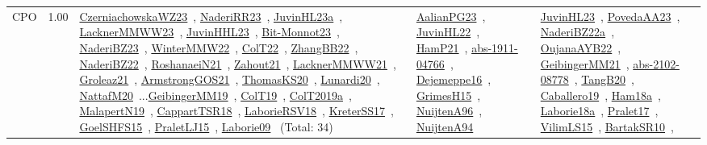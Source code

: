 {\begin{longtable}{p{3cm}r>{\raggedright\arraybackslash}p{6cm}>{\raggedright\arraybackslash}p{6cm}>{\raggedright\arraybackslash}p{8cm}}
\index{CPO}\index{CPSystems!CPO}CPO &  1.00 & \href{../works/CzerniachowskaWZ23.pdf}{CzerniachowskaWZ23}~\cite{CzerniachowskaWZ23}, \href{../works/NaderiRR23.pdf}{NaderiRR23}~\cite{NaderiRR23}, \href{../works/JuvinHL23a.pdf}{JuvinHL23a}~\cite{JuvinHL23a}, \href{../works/LacknerMMWW23.pdf}{LacknerMMWW23}~\cite{LacknerMMWW23}, \href{../works/JuvinHHL23.pdf}{JuvinHHL23}~\cite{JuvinHHL23}, \href{../works/Bit-Monnot23.pdf}{Bit-Monnot23}~\cite{Bit-Monnot23}, \href{../works/NaderiBZ23.pdf}{NaderiBZ23}~\cite{NaderiBZ23}, \href{../works/WinterMMW22.pdf}{WinterMMW22}~\cite{WinterMMW22}, \href{../works/ColT22.pdf}{ColT22}~\cite{ColT22}, \href{../works/ZhangBB22.pdf}{ZhangBB22}~\cite{ZhangBB22}, \href{../works/NaderiBZ22.pdf}{NaderiBZ22}~\cite{NaderiBZ22}, \href{../works/RoshanaeiN21.pdf}{RoshanaeiN21}~\cite{RoshanaeiN21}, \href{../works/Zahout21.pdf}{Zahout21}~\cite{Zahout21}, \href{../works/LacknerMMWW21.pdf}{LacknerMMWW21}~\cite{LacknerMMWW21}, \href{../works/Groleaz21.pdf}{Groleaz21}~\cite{Groleaz21}, \href{../works/ArmstrongGOS21.pdf}{ArmstrongGOS21}~\cite{ArmstrongGOS21}, \href{../works/ThomasKS20.pdf}{ThomasKS20}~\cite{ThomasKS20}, \href{../works/Lunardi20.pdf}{Lunardi20}~\cite{Lunardi20}, \href{../works/NattafM20.pdf}{NattafM20}~\cite{NattafM20}...\href{../works/GeibingerMM19.pdf}{GeibingerMM19}~\cite{GeibingerMM19}, \href{../works/ColT19.pdf}{ColT19}~\cite{ColT19}, \href{../works/ColT2019a.pdf}{ColT2019a}~\cite{ColT2019a}, \href{../works/MalapertN19.pdf}{MalapertN19}~\cite{MalapertN19}, \href{../works/CappartTSR18.pdf}{CappartTSR18}~\cite{CappartTSR18}, \href{../works/LaborieRSV18.pdf}{LaborieRSV18}~\cite{LaborieRSV18}, \href{../works/KreterSS17.pdf}{KreterSS17}~\cite{KreterSS17}, \href{../works/GoelSHFS15.pdf}{GoelSHFS15}~\cite{GoelSHFS15}, \href{../works/PraletLJ15.pdf}{PraletLJ15}~\cite{PraletLJ15}, \href{../works/Laborie09.pdf}{Laborie09}~\cite{Laborie09} (Total: 34) & \href{../works/AalianPG23.pdf}{AalianPG23}~\cite{AalianPG23}, \href{../works/JuvinHL22.pdf}{JuvinHL22}~\cite{JuvinHL22}, \href{../works/HamP21.pdf}{HamP21}~\cite{HamP21}, \href{../works/abs-1911-04766.pdf}{abs-1911-04766}~\cite{abs-1911-04766}, \href{../works/Dejemeppe16.pdf}{Dejemeppe16}~\cite{Dejemeppe16}, \href{../works/GrimesH15.pdf}{GrimesH15}~\cite{GrimesH15}, \href{../works/NuijtenA96.pdf}{NuijtenA96}~\cite{NuijtenA96}, \href{../works/NuijtenA94.pdf}{NuijtenA94}~\cite{NuijtenA94} & \href{../works/JuvinHL23.pdf}{JuvinHL23}~\cite{JuvinHL23}, \href{../works/PovedaAA23.pdf}{PovedaAA23}~\cite{PovedaAA23}, \href{../works/NaderiBZ22a.pdf}{NaderiBZ22a}~\cite{NaderiBZ22a}, \href{../works/OujanaAYB22.pdf}{OujanaAYB22}~\cite{OujanaAYB22}, \href{../works/GeibingerMM21.pdf}{GeibingerMM21}~\cite{GeibingerMM21}, \href{../works/abs-2102-08778.pdf}{abs-2102-08778}~\cite{abs-2102-08778}, \href{../works/TangB20.pdf}{TangB20}~\cite{TangB20}, \href{../works/Caballero19.pdf}{Caballero19}~\cite{Caballero19}, \href{../works/Ham18a.pdf}{Ham18a}~\cite{Ham18a}, \href{../works/Laborie18a.pdf}{Laborie18a}~\cite{Laborie18a}, \href{../works/Pralet17.pdf}{Pralet17}~\cite{Pralet17}, \href{../works/VilimLS15.pdf}{VilimLS15}~\cite{VilimLS15}, \href{../works/BartakSR10.pdf}{BartakSR10}~\cite{BartakSR10}, 
\end{longtable}}
